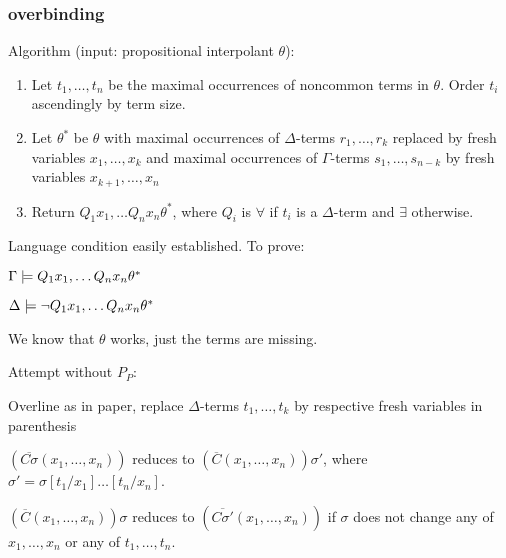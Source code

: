 	\subsubsection{overbinding}

	Algorithm (input: propositional interpolant $\theta$):
	\begin{enumerate}
		\item Let $t_1, \ldots, t_n$ be the maximal occurrences of noncommon terms in $\theta$. Order $t_i$ ascendingly by term size. 
		\item Let $\theta^*$ be $\theta$ with maximal occurrences of $\Delta$-terms $r_1, \ldots, r_k$ replaced by fresh variables $x_1, \ldots, x_k$ and maximal occurrences of $\Gamma$-terms $s_1, \ldots, s_{n-k}$ by fresh variables $x_{k+1}, \ldots, x_{n}$
		\item Return $Q_1 x_1, \ldots Q_n x_n \theta^*$, where $Q_i$ is $\forall$ if $t_i$ is a $\Delta$-term and $\exists$ otherwise.
	\end{enumerate}

	Language condition easily established. To prove:

	$\Gamma \models Q_1 x_1, \ldots Q_n x_n \theta^*$

	$\Delta \models \lnot Q_1 x_1, \ldots Q_n x_n \theta^*$

	We know that $\theta$ works, just the terms are missing.

	\clearpage
	Attempt without $P_P$:


	\begin{defi}
		\label{def:overline}
		Overline as in paper, replace $\Delta$-terms $t_1, \ldots, t_k$ by respective fresh variables in parenthesis
	\end{defi}

	\begin{lemma}
		\label{lemma:overline}
		$(\overline{C\sigma}(x_1, \ldots, x_n))$ reduces to
		$(\overline{C}(x_1, \ldots, x_n))\sigma'$, where $\sigma' = \sigma[t_1 / x_1]\ldots[t_n / x_n]$.

		$(\overline{C}(x_1, \ldots, x_n))\sigma$ reduces to
		$(\overline{C\sigma'}(x_1, \ldots, x_n))$ if $\sigma$ does not change any of $x_1, \ldots, x_n$ or any of $t_1, \ldots, t_n$.\qedhere

		
	\end{lemma}

